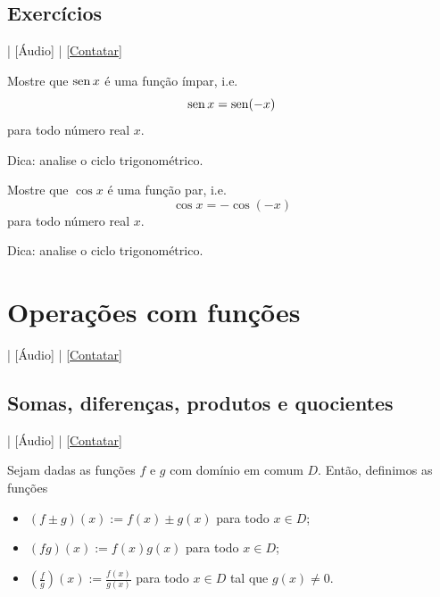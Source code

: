 \subsection*{Exercícios}

\begin{flushright}
  [Vídeo] | [Áudio] | \href{https://phkonzen.github.io/notas/contato.html}{[Contatar]}
\end{flushright}

\begin{exer}
  Mostre que $\operatorname{sen} x$ é  uma função ímpar, i.e.
  \begin{equation}
    \operatorname{sen} x = \operatorname{sen}(-x)
  \end{equation}
  para todo número real $x$.
\end{exer}
\begin{resp}
  Dica: analise o ciclo trigonométrico.
\end{resp}

\begin{exer}
  Mostre que $\cos x$ é  uma função par, i.e.
  \begin{equation}
    \cos x = -\cos(-x)
  \end{equation}
  para todo número real $x$.
\end{exer}
\begin{resp}
  Dica: analise o ciclo trigonométrico.
\end{resp}

\section{Operações com funções}\label{cap_funcao_sec_opfun}

\begin{flushright}
  [Vídeo] | [Áudio] | \href{https://phkonzen.github.io/notas/contato.html}{[Contatar]}
\end{flushright}

\subsection{Somas, diferenças, produtos e quocientes}

\begin{flushright}
  [Vídeo] | [Áudio] | \href{https://phkonzen.github.io/notas/contato.html}{[Contatar]}
\end{flushright}

Sejam dadas as funções $f$ e $g$ com domínio em comum $D$. Então, definimos as funções
\begin{itemize}
\item $(f\pm g)(x) := f(x) \pm g(x)$ para todo $x\in D$;
\item $(fg)(x) := f(x)g(x)$ para todo $x\in D$;
\item $\displaystyle \left(\frac{f}{g}\right)(x) := \frac{f(x)}{g(x)}$ para todo $x\in D$ tal que $g(x)\neq 0$.
\end{itemize}


